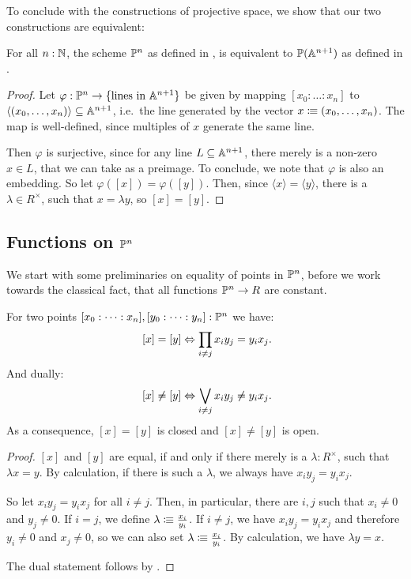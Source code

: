To conclude with the constructions of projective space,
we show that our two constructions are equivalent:

\begin{proposition}
  \label{space-of-lines-is-projective-space}
  For all $n:\mathbb{N}$, the scheme $\mathbb{P}^n$ as defined in ,
  is equivalent to $\mathbb{P}(\mathbb{A}^{n+1})$ as defined in .
\end{proposition}

\begin{proof}
  Let $\varphi:\mathbb{P}^n\to \{\text{lines in $\mathbb{A}^{n+1}$}\}$
  be given by mapping $[x_0:\dots:x_n]$ to $\langle (x_0,\dots,x_n)\rangle\subseteq \mathbb{A}^{n+1}$,
  i.e.\ the line generated by the vector $x\vcentcolon\mspace{-1.2mu}\equiv (x_0,\dots,x_n)$.
  The map is well-defined, since multiples of $x$ generate the same line.

  Then $\varphi$ is surjective,
  since for any line $L\subseteq \mathbb{A}^{n+1}$,
  there merely is a non-zero $x\in L$,
  that we can take as a preimage.
  To conclude, we note that $\varphi$ is also an embedding.
  So let $\varphi([x])=\varphi([y])$.
  Then, since $\langle x\rangle=\langle y\rangle$, there is a $\lambda\in R^\times$,
  such that $x=\lambda y$, so $[x]=[y]$.
\end{proof}

\subsection{Functions on $\mathbb{P}^n$}

We start with some preliminaries on equality of points in $\mathbb{P}^n$,
before we work towards the classical fact, that all functions $\mathbb{P}^n\to R$ are constant.

\begin{lemma}
  \label{equality-2-by-2-minor}
  For two points $[x_0:\dots:x_n],[y_0:\dots:y_n]:\mathbb{P}^n$ we have:
  \[
    [x]=[y] \Leftrightarrow \prod_{i\neq j}x_iy_j=y_ix_j
    \rlap{.}
  \]
  And dually:
  \[
    [x]\neq [y] \Leftrightarrow \bigvee_{i\neq j}x_iy_j\neq y_ix_j
    \rlap{.}
  \]
  As a consequence, $[x]=[y]$ is closed and $[x]\neq [y]$ is open.
\end{lemma}

\begin{proof}
  $[x]$ and $[y]$ are equal,
  if and only if there merely is a $\lambda:R^\times$,
  such that $\lambda x = y$.
  By calculation, if there is such a $\lambda$,
  we always have $x_iy_j=y_ix_j$.

  So let $x_iy_j=y_ix_j$ for all $i\neq j$.
  Then, in particular, there are $i,j$ such that $x_i\neq 0$ and $y_j\neq 0$.
  If $i=j$, we define $\lambda \vcentcolon\mspace{-1.2mu}\equiv \frac{x_i}{y_i}$.
  If $i\neq j$, we have $x_iy_j=y_ix_j$ and therefore $y_i\neq 0$ and $x_j\neq 0$,
  so we can also set $\lambda \vcentcolon\mspace{-1.2mu}\equiv \frac{x_i}{y_i}$.
  By calculation, we have $\lambda y=x$.

  The dual statement follows by .
\end{proof}

